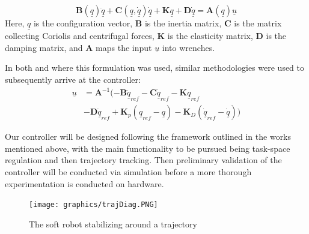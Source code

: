 \begin{equation}
    \mathbf{B}(\underline{q})\underline{\ddot{q}} + \mathbf{C}(\underline{q},\underline{\dot{q}})\underline{\dot{q}} + \mathbf{K}\underline{q} + \mathbf{D}\underline{\dot{q}} = \mathbf{A}(\underline{q})\underline{u}
    \label{eq:dynamics}
\end{equation}
Here, $\underline{q}$ is the configuration vector, $\mathbf{B}$ is the inertia matrix, $\mathbf{C}$ is the matrix collecting Coriolis and centrifugal forces, $\mathbf{K}$ is the elasticity matrix, $\mathbf{D}$ is the damping matrix, and $\mathbf{A}$ maps the input $\underline{u}$ into wrenches.

In both \cite{della_santina_model-based_2020} and \cite{della_santina_improved_2020} where this formulation was used, similar methodologies were used to subsequently arrive at the controller:
\begin{equation}
    \label{eq:controller}
    \begin{split}
        \underline{u} &= \mathbf{A}^{-1}(-\mathbf{B}\underline{\ddot{q}}_{ref} - \mathbf{C}\underline{\dot{q}}_{ref} - \mathbf{K}\underline{q}_{ref}\\
        &- \mathbf{D}\underline{\dot{q}}_{ref} + \mathbf{K}_p(\underline{q}_{ref}-\underline{q}) - \mathbf{K}_D(\underline{\dot{q}}_{ref}-\underline{\dot{q}}))
    \end{split}
\end{equation}

Our controller will be designed following the framework outlined in the works mentioned above, with the main functionality to be pursued being task-space regulation and then trajectory tracking. Then preliminary validation of the controller will be conducted via simulation before a more thorough experimentation is conducted on hardware.   

\begin{figure}[!ht]
    \centering
    \texttt{[image: graphics/trajDiag.PNG]}
    \caption{The soft robot stabilizing around a trajectory}
    \label{taskspace}
\end{figure}

